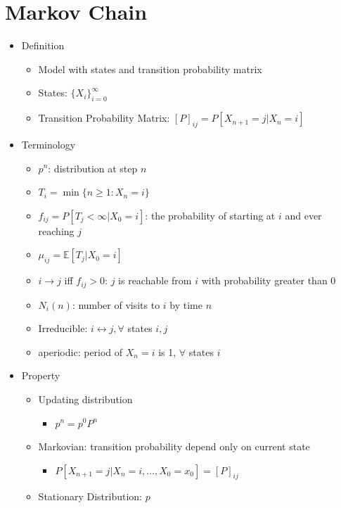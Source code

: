 \documentclass[a4paper]{article}
\begin{document}
\section{Markov Chain}
\begin{itemize}
    \item Definition
        \begin{itemize}
            \item Model with states and transition probability matrix
            \item States: $\{X_i\}_{i=0}^\infty$
            \item Transition Probability Matrix: $[P]_{ij} = P[X_{n+1} = j|X_n = i]$
        \end{itemize}
    \item Terminology
        \begin{itemize}
            \item $p^n$: distribution at step $n$
            \item $T_i = \min\{n \geq 1: X_n = i\}$
            \item $f_{ij} = P[T_j < \infty | X_0 = i]$: the probability of starting at $i$ and ever reaching $j$
            \item $\mu_{ij} = \mathbb{E}[T_j | X_0 = i]$
            \item $i \rightarrow j$ iff $f_{ij} > 0$: $j$ is reachable from $i$ with probability greater than 0
            \item $N_i(n)$: number of visits to $i$ by time $n$
            \item Irreducible: $i \leftrightarrow j, \forall$ states $i, j$
            \item aperiodic: period of $X_n = i$ is 1, $\forall$ states $i$
        \end{itemize}
    \item Property
        \begin{itemize}
            \item Updating distribution
                \begin{itemize}
                    \item $p^n = p^0 P^n$
                \end{itemize}
            \item Markovian: transition probability depend only on current state
                \begin{itemize}
                    \item $P[X_{n+1} = j|X_n = i, \dots, X_0 = x_0] = [P]_{ij}$
                \end{itemize}
            \item Stationary Distribution: $p$


\end{itemize}
\end{itemize}
\end{document}
